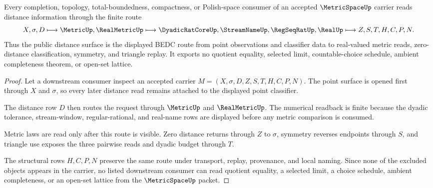 \begin{theorem}
\label{thm:metric-space-distance-route}
Every completion, topology, total-boundedness, compactness, or Polish-space consumer of an accepted $\MetricSpaceUp$ carrier reads distance information through the finite route
$$
X,\sigma,D
\longmapsto
\MetricUp,\RealMetricUp
\longmapsto
\DyadicRatCoreUp,\StreamNameUp,\RegSeqRatUp,\RealUp
\longmapsto
Z,S,T,H,C,P,N .
$$
Thus the public distance surface is the displayed BEDC route from point observations and classifier data to real-valued metric reads, zero-distance classification, symmetry, and triangle replay. It exports no quotient equality, selected limit, countable-choice schedule, ambient completeness theorem, or open-set lattice.
\end{theorem}
\begin{proof}
Let a downstream consumer inspect an accepted carrier $M=(X,\sigma,D,Z,S,T,H,C,P,N)$. The point surface is opened first through $X$ and $\sigma$, so every later distance read remains attached to the displayed point classifier.

The distance row $D$ then routes the request through $\MetricUp$ and $\RealMetricUp$. The numerical readback is finite because the dyadic tolerance, stream-window, regular-rational, and real-name rows are displayed before any metric comparison is consumed.

Metric laws are read only after this route is visible. Zero distance returns through $Z$ to $\sigma$, symmetry reverses endpoints through $S$, and triangle use exposes the three pairwise reads and dyadic budget through $T$.

The structural rows $H,C,P,N$ preserve the same route under transport, replay, provenance, and local naming. Since none of the excluded objects appears in the carrier, no listed downstream consumer can read quotient equality, a selected limit, a choice schedule, ambient completeness, or an open-set lattice from the $\MetricSpaceUp$ packet.
\end{proof}
